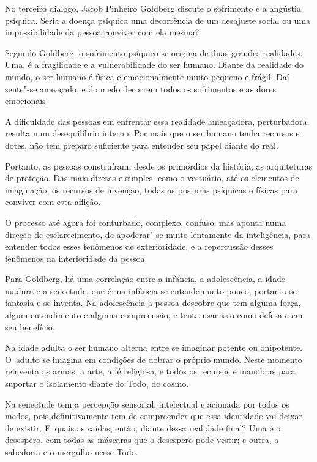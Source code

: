  

No terceiro diálogo, Jacob Pinheiro Goldberg discute o sofrimento e a
angústia psíquica. Seria a doença psíquica uma decorrência de um
desajuste social ou uma impossibilidade da pessoa conviver com ela
mesma?

Segundo Goldberg, o sofrimento psíquico se origina de duas grandes
realidades. Uma, é a fragilidade e a vulnerabilidade do ser humano.
Diante da realidade do mundo, o ser humano é física e emocionalmente
muito pequeno e frágil. Daí sente"-se ameaçado, e do medo decorrem todos
os sofrimentos e as dores emocionais.

A dificuldade das pessoas em enfrentar essa realidade ameaçadora,
perturbadora, resulta num desequilíbrio interno. Por mais que o ser
humano tenha recursos e dotes, não tem preparo suficiente para entender
seu papel diante do real.

Portanto, as pessoas construíram, desde os primórdios da história, as
arquiteturas de proteção. Das mais diretas e simples, como o vestuário,
até os elementos de imaginação, os recursos de invenção, todas as
posturas psíquicas e físicas para conviver com esta aflição.

O processo até agora foi conturbado, complexo, confuso, mas aponta numa
direção de esclarecimento, de apoderar"-se muito lentamente da
inteligência, para entender todos esses fenômenos de exterioridade, e a
repercussão desses fenômenos na interioridade da pessoa.

Para Goldberg, há uma correlação entre a infância, a adolescência, a
idade madura e a senectude, que é: na infância se entende muito pouco,
portanto se fantasia e se inventa. Na adolescência a pessoa descobre que
tem alguma força, algum entendimento e alguma compreensão, e tenta usar
isso como defesa e em seu benefício.

Na idade adulta o ser humano alterna entre se imaginar potente ou
onipotente. O~adulto se imagina em condições de dobrar o próprio mundo.
Neste momento reinventa as armas, a arte, a fé religiosa, e todos os
recursos e manobras para suportar o isolamento diante do Todo, do cosmo.

Na senectude tem a percepção sensorial, intelectual e acionada por todos
os medos, pois definitivamente tem de compreender que essa identidade
vai deixar de existir. E~quais as saídas, então, diante dessa realidade
final? Uma é o desespero, com todas as máscaras que o desespero pode
vestir; e outra, a sabedoria e o mergulho nesse Todo.

